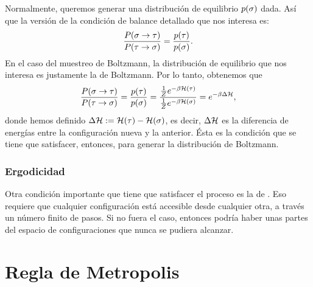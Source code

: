 Normalmente, queremos generar una distribución de equilibrio $p(\ss)$ dada. Así que la versión de la condición de balance detallado que nos interesa es:
\begin{equation}
\frac{P(\ss \to \tt)}{P(\tt \to \ss)} =  \frac{p(\tt)}{p(\ss)}.
\label{eq:balance-detallado}
\end{equation}
En el caso del muestreo de Boltzmann, la distribución de equilibrio que nos interesa es justamente la de Boltzmann. Por lo tanto, obtenemos que
\begin{equation}
\frac{P(\ss \to \tt)}{P(\tt \to \ss)} =  \frac{p(\tt)}{p(\ss)} = \frac{\frac{1}{Z} e^{-\beta \HH(\tt)}}{\frac{1}{Z} e^{-\beta \HH(\ss)}} = e^{-\beta \Delta \HH},
\label{eq:balance-detallado-boltz}
\end{equation}
donde hemos definido \( \Delta \HH \defeq \HH(\tt) - \HH(\ss) \), es decir, $\Delta \HH$ es la diferencia de energías entre la configuración nueva y la anterior.
Ésta es la condición que se tiene que satisfacer, entonces, para generar la distribución de Boltzmann.


\subsubsection{Ergodicidad}
Otra condición importante que tiene que satisfacer el proceso es la de . Eso requiere que cualquier configuración está accesible
desde cualquier otra, a través un número finito de pasos. Si no fuera el caso, entonces podría haber unas partes del espacio de configuraciones que nunca se
pudiera alcanzar.


\section{Regla de Metropolis}






